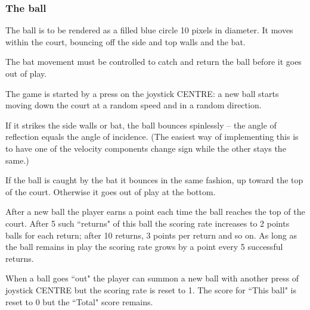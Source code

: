 \documentclass[a4paper]{article}
\begin{document}
\subsubsection{The ball}
The ball is to be rendered as a filled blue circle 10 pixels in
diameter. It moves within the court, bouncing off the side and top
walls and the bat.

\begin{center}
\end{center}

The bat movement must be controlled to catch and return the ball
before it goes out of play.

The game is started by a press on the joystick CENTRE: a new ball
starts moving down the court at a random speed and in a random
direction.

If it strikes the side walls or bat, the ball bounces spinlessly --
the angle of reflection equals the angle of incidence. (The easiest
way of implementing this is to have one of the velocity components
change sign while the other stays the same.)

If the ball is caught by the bat it bounces in the same fashion, up
toward the top of the court.  Otherwise it goes out of play at the
bottom.

After a new ball the player earns a point each time the ball reaches
the top of the court.  After 5 such ``returns" of this ball the
scoring rate increases to 2 points balls for each return; after 10
returns, 3 points per return and so on. As long as the ball remains in
play the scoring rate grows by a point every 5 successful returns.

When a ball goes ``out" the player can summon a new ball with another
press of joystick CENTRE but the scoring rate is reset to 1. The score
for ``This ball" is reset to 0 but the ``Total" score remains.
\end{document}
